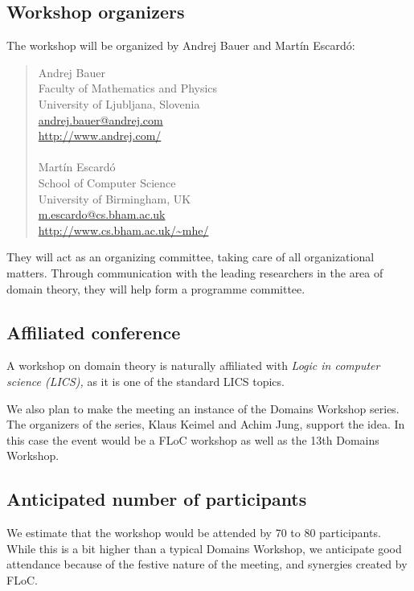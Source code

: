 \documentclass{article}
\begin{document}
\subsection{Workshop organizers}

The workshop will be organized by Andrej Bauer and Martín Escardó:
%
\begin{quote}
Andrej Bauer \\
Faculty of Mathematics and Physics \\
University of Ljubljana, Slovenia \\
\url{andrej.bauer@andrej.com} \\
\url{http://www.andrej.com/} \\
~ \\
Martín Escardó \\
School of Computer Science \\
University of Birmingham, UK \\
\url{m.escardo@cs.bham.ac.uk} \\
\url{http://www.cs.bham.ac.uk/~mhe/}
\end{quote}

\noindent %
They will act as an organizing committee, taking care of all organizational matters.
Through communication with the leading researchers in the area of domain theory, they will
help form a programme committee.

\subsection{Affiliated conference}

A workshop on domain theory is naturally affiliated with \emph{Logic in computer science
  (LICS),} as it is one of the standard LICS topics.

We also plan to make the meeting an instance of the Domains Workshop series. The
organizers of the series, Klaus Keimel and Achim Jung, support the idea. In this case the
event would be a FLoC workshop as well as the 13th Domains Workshop.

\subsection{Anticipated number of participants}
\label{sec:antic-numb-part}

We estimate that the workshop would be attended by 70 to 80 participants. While this is a
bit higher than a typical Domains Workshop, we anticipate good attendance because of the
festive nature of the meeting, and synergies created by FLoC.
\end{document}
